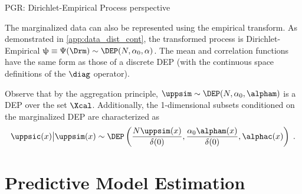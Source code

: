 \documentclass[12pt]{report}
\begin{document}
PGR: Dirichlet-Empirical Process perspective

The marginalized data can also be represented using the empirical transform. As demonstrated in \cref{app:data_dist_cont}, the transformed process is Dirichlet-Empirical $\uppsi \equiv \Psi(\Drm) \sim \DEP(N,\alpha_0,\alpha)$. The mean and correlation functions have the same form as those of a discrete DEP (with the continuous space definitions of the $\diag$ operator).


Observe that by the aggregation principle, $\uppsim \sim \DEP(N,\alpha_0,\alpham)$ is a DEP over the set $\Xcal$. Additionally, the 1-dimensional subsets conditioned on the marginalized DEP are characterized as
\begin{equation}
\uppsic(x) \big| \uppsim(x) \sim \DEP\left( \frac{N \uppsim(x)}{\delta(0)}, \frac{\alpha_0 \alpham(x)}{\delta(0)}, \alphac(x) \right) \;.
\end{equation}











\section{Predictive Model Estimation} \label{sec:predictive_est_dir_cont}
\end{document}
